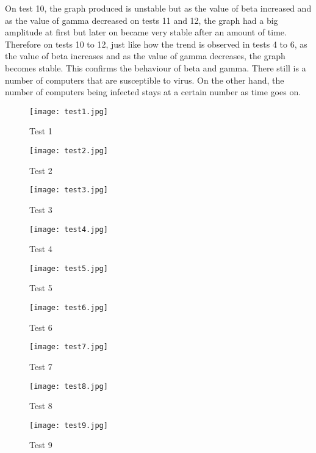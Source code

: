 \documentclass{acm_proc_article-sp}
\begin{document}
On test 10, the graph produced is unstable but as the value of beta increased and as the value of gamma decreased on tests 11 and 12, the graph had a big amplitude at first but later on became very stable after an amount of time. Therefore on tests 10 to 12, just like how the trend is observed in tests 4 to 6, as the value of beta increases and as the value of gamma decreases, the graph becomes stable. This confirms the behaviour of beta and gamma. There still is a number of computers that are susceptible to virus. On the other hand, the number of computers being infected stays at a certain number as time goes on.

\begin{figure}
  \texttt{[image: test1.jpg]}
  \caption{Test 1}
  \label{fig:test1}
\end{figure}

\begin{figure}
  \texttt{[image: test2.jpg]}
  \caption{Test 2}
  \label{fig:test2}
\end{figure}

\begin{figure}
  \texttt{[image: test3.jpg]}
  \caption{Test 3}
  \label{fig:test3}
\end{figure}

\begin{figure}
  \texttt{[image: test4.jpg]}
  \caption{Test 4}
  \label{fig:test4}
\end{figure}

\begin{figure}
  \texttt{[image: test5.jpg]}
  \caption{Test 5}
  \label{fig:test5}
\end{figure}

\begin{figure}
  \texttt{[image: test6.jpg]}
  \caption{Test 6}
  \label{fig:test6}
\end{figure}

\begin{figure}
  \texttt{[image: test7.jpg]}
  \caption{Test 7}
  \label{fig:test7}
\end{figure}

\begin{figure}
  \texttt{[image: test8.jpg]}
  \caption{Test 8}
  \label{fig:test8}
\end{figure}

\begin{figure}
  \texttt{[image: test9.jpg]}
  \caption{Test 9}
  \label{fig:test9}
\end{figure}
\end{document}
